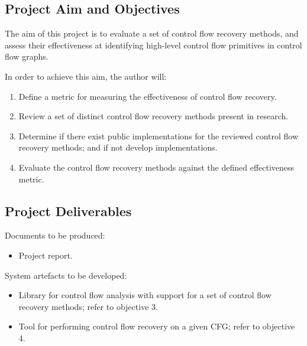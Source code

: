 \documentclass[12pt, a4paper]{article}
\begin{document}

\subsection{Project Aim and Objectives}

The aim of this project is to evaluate a set of control flow recovery methods, and assess their effectiveness at identifying high-level control flow primitives in control flow graphs.

In order to achieve this aim, the author will:

\begin{enumerate}
	\item \label{itm:obj_define_effectiveness_metric} Define a metric for measuring the effectiveness of control flow recovery.
	\item \label{itm:obj_review_cfa_methods} Review a set of distinct control flow recovery methods present in research.
	\item \label{itm:obj_cfa_components} Determine if there exist public implementations for the reviewed control flow recovery methods; and if not develop implementations.
	\item \label{itm:obj_cfa_evaluation} Evaluate the control flow recovery methods against the defined effectiveness metric.
\end{enumerate}


\subsection{Project Deliverables}

Documents to be produced:

\begin{itemize}
	\item Project report.
\end{itemize}

System artefacts to be developed:

\begin{itemize}
	\item Library for control flow analysis with support for a set of control flow recovery methods; refer to objective 3.
	\item Tool for performing control flow recovery on a given CFG; refer to objective 4.
\end{itemize}
\end{document}
